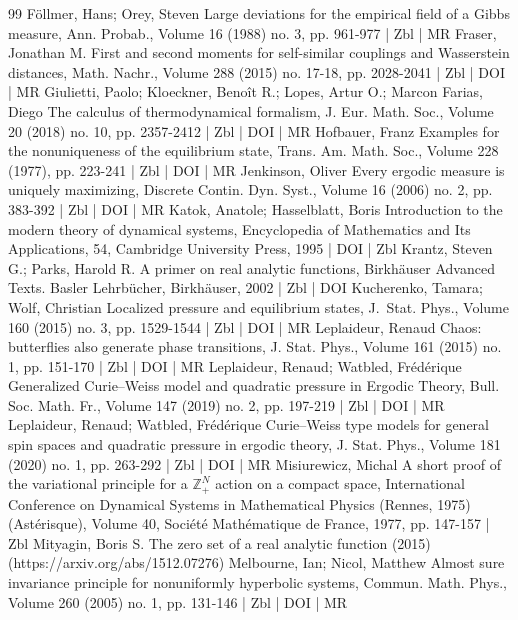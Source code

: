 \begin{thebibliography}{99}
Föllmer, Hans; Orey, Steven Large deviations for the empirical field of a Gibbs measure, Ann. Probab., Volume 16 (1988) no. 3, pp. 961-977 | Zbl | MR
Fraser, Jonathan M. First and second moments for self-similar couplings and Wasserstein distances, Math. Nachr., Volume 288 (2015) no. 17-18, pp. 2028-2041 | Zbl | DOI | MR
Giulietti, Paolo; Kloeckner, Benoît R.; Lopes, Artur O.; Marcon Farias, Diego The calculus of thermodynamical formalism, J. Eur. Math. Soc., Volume 20 (2018) no. 10, pp. 2357-2412 | Zbl | DOI | MR
Hofbauer, Franz Examples for the nonuniqueness of the equilibrium state, Trans. Am. Math. Soc., Volume 228 (1977), pp. 223-241 | Zbl | DOI | MR
Jenkinson, Oliver Every ergodic measure is uniquely maximizing, Discrete Contin. Dyn. Syst., Volume 16 (2006) no. 2, pp. 383-392 | Zbl | DOI | MR
Katok, Anatole; Hasselblatt, Boris Introduction to the modern theory of dynamical systems, Encyclopedia of Mathematics and Its Applications, 54, Cambridge University Press, 1995 | DOI | Zbl
Krantz, Steven G.; Parks, Harold R. A primer on real analytic functions, Birkhäuser Advanced Texts. Basler Lehrbücher, Birkhäuser, 2002 | Zbl | DOI
Kucherenko, Tamara; Wolf, Christian Localized pressure and equilibrium states, J. Stat. Phys., Volume 160 (2015) no. 3, pp. 1529-1544 | Zbl | DOI | MR
Leplaideur, Renaud Chaos: butterflies also generate phase transitions, J. Stat. Phys., Volume 161 (2015) no. 1, pp. 151-170 | Zbl | DOI | MR
Leplaideur, Renaud; Watbled, Frédérique Generalized Curie–Weiss model and quadratic pressure in Ergodic Theory, Bull. Soc. Math. Fr., Volume 147 (2019) no. 2, pp. 197-219 | Zbl | DOI | MR
Leplaideur, Renaud; Watbled, Frédérique Curie–Weiss type models for general spin spaces and quadratic pressure in ergodic theory, J. Stat. Phys., Volume 181 (2020) no. 1, pp. 263-292 | Zbl | DOI | MR
Misiurewicz, Michal A short proof of the variational principle for a $\mathbb{Z}^N_+$ action on a compact space, International Conference on Dynamical Systems in Mathematical Physics (Rennes, 1975) (Astérisque), Volume 40, Société Mathématique de France, 1977, pp. 147-157 | Zbl
Mityagin, Boris S. The zero set of a real analytic function (2015) (https://arxiv.org/abs/1512.07276)
Melbourne, Ian; Nicol, Matthew Almost sure invariance principle for nonuniformly hyperbolic systems, Commun. Math. Phys., Volume 260 (2005) no. 1, pp. 131-146 | Zbl | DOI | MR

\end{thebibliography}
